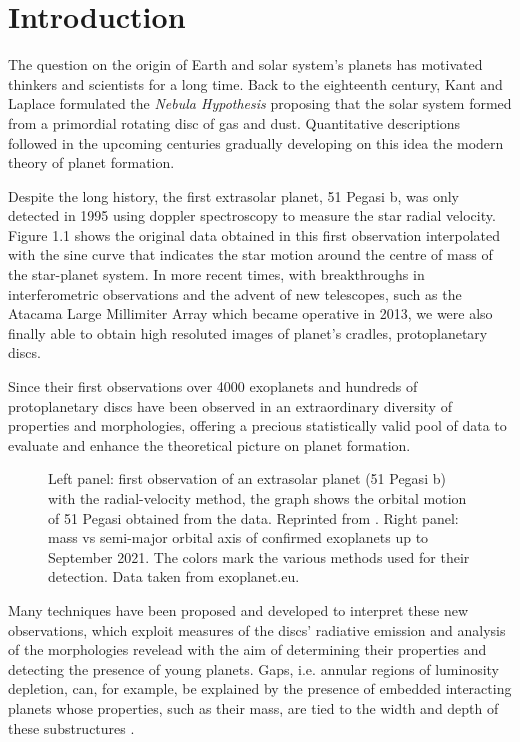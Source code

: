 \documentclass[a4paper,10pt]{report}
\begin{document}
\tableofcontents

\chapter{Introduction}

The question on the origin of Earth and solar system's planets has motivated 
thinkers and scientists for a long time.
Back to the eighteenth century, Kant and Laplace formulated the
\emph{Nebula Hypothesis} proposing that the solar system
formed from a primordial rotating disc of gas and dust. Quantitative descriptions followed in the upcoming centuries 
gradually developing on this idea the modern theory of planet formation.

Despite the long history, the first extrasolar planet, 51 Pegasi b, was only detected in 1995 using doppler spectroscopy to
measure the star radial velocity. Figure 1.1 shows the original data obtained in this first observation \citep{Mayor1995}
interpolated with the sine curve that indicates the star motion around the centre of mass of the star-planet system.
In more recent times, with breakthroughs in interferometric observations 
and the advent of new telescopes, such as the Atacama Large Millimiter Array which became operative in 2013, we were also
finally able to obtain high resoluted images of planet's
cradles, protoplanetary discs.

Since their first observations over 4000 exoplanets and hundreds of protoplanetary discs have been observed in an extraordinary 
diversity of properties and morphologies, 
offering a precious statistically valid pool of data to evaluate and enhance
the theoretical picture on planet formation.

\begin{figure}
    \begin{center}
    \scalebox{0.78}{}
    \end{center}
    \caption{Left panel: first observation of an extrasolar planet (51 Pegasi b) with the radial-velocity method, the graph shows the orbital motion 
    of 51 Pegasi obtained from the data. Reprinted from \citet{Mayor1995}. Right panel:
    mass vs semi-major orbital axis of confirmed exoplanets up to September 2021. The colors 
    mark the various methods used for their detection. Data taken from exoplanet.eu.}
\end{figure}

Many techniques have been proposed and developed to interpret these new observations,
which exploit measures of the discs' radiative emission and analysis of the morphologies revelead
with the aim of determining their properties and detecting the presence of young planets.
Gaps, i.e. annular regions of luminosity depletion, can, for example, be explained 
by the presence of embedded interacting planets whose properties, such as their mass, are
tied to the width and depth of these substructures \citep{gap_opening1,gap_opening2,gap_opening3}.
\end{document}
